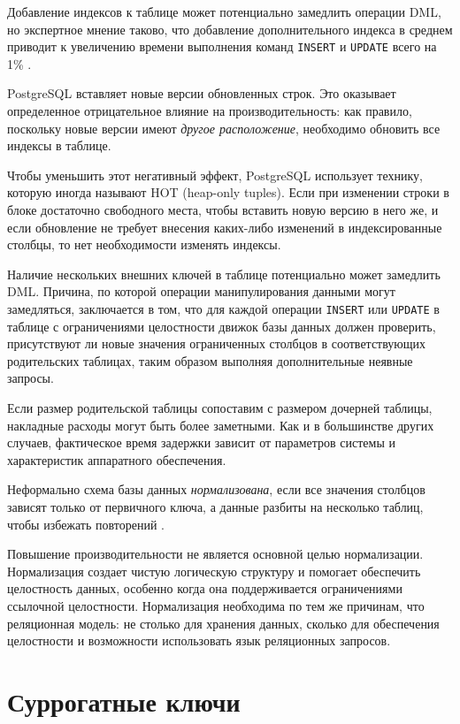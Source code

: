 \documentclass[%
	11pt,
	a4paper,
	utf8,
		]{article}
\begin{document}
Добавление индексов к таблице может потенциально замедлить операции DML, но экспертное мнение таково, что добавление дополнительного индекса в среднем приводит к увеличению времени выполнения команд \verb|INSERT| и \verb|UPDATE| всего на 1\% \cite[]{dombrovskaya:postgresql-2022}.

PostgreSQL вставляет новые версии обновленных строк. Это оказывает определенное отрицательное влияние на производительность: как правило, поскольку новые версии имеют \emph{другое расположение}, необходимо обновить все индексы в таблице. 

Чтобы уменьшить этот негативный эффект, PostgreSQL использует технику, которую иногда называют HOT (heap-only tuples). Если при изменении строки в блоке достаточно свободного места, чтобы вставить новую версию в него же, и если обновление не требует внесения каких-либо изменений в индексированные столбцы, то нет необходимости изменять индексы.

Наличие нескольких внешних ключей в таблице потенциально может замедлить DML. Причина, по которой операции манипулирования данными могут замедляться, заключается в том, что для каждой операции \verb|INSERT| или \verb|UPDATE| в таблице с ограничениями целостности движок базы данных должен проверить, присутствуют ли новые значения ограниченных столбцов в соответствующих родительских таблицах, таким образом выполняя дополнительные неявные запросы.

Если размер родительской таблицы сопоставим с размером дочерней таблицы, накладные расходы могут быть более заметными. Как и в большинстве других случаев, фактическое время задержки зависит от параметров системы и характеристик аппаратного обеспечения.

Неформально схема базы данных \emph{нормализована}, если все значения столбцов зависят только от первичного ключа, а данные разбиты на несколько таблиц, чтобы избежать повторений \cite[]{dombrovskaya:postgresql-2022}.

Повышение производительности не является основной целью нормализации. Нормализация создает чистую логическую структуру и помогает обеспечить целостность данных, особенно когда она поддерживается ограничениями ссылочной целостности. Нормализация необходима по тем же причинам, что реляционная модель: не столько для хранения данных, сколько для обеспечения целостности и возможности использовать язык реляционных запросов.

\section{Суррогатные ключи}
\end{document}
